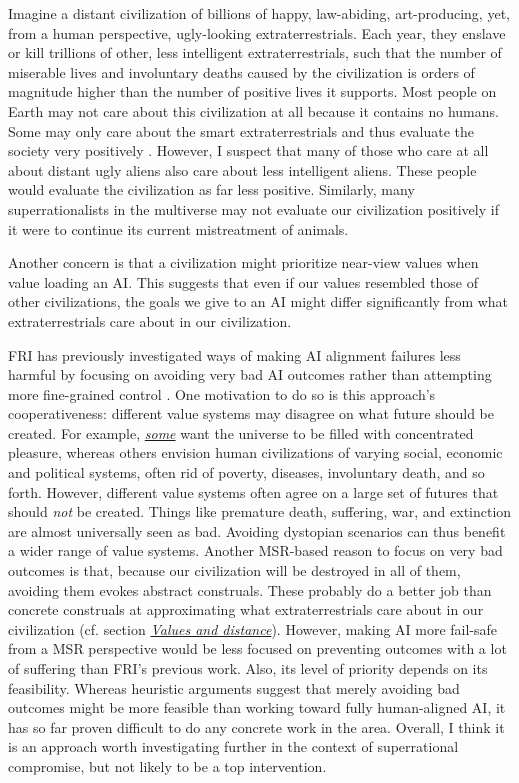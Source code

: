 Imagine a distant civilization of billions of happy, law-abiding,
art-producing, yet, from a human perspective, ugly-looking
extraterrestrials. Each year, they enslave or kill trillions of other,
less intelligent extraterrestrials, such that the number of miserable
lives and involuntary deaths caused by the civilization is orders of
magnitude higher than the number of positive lives it supports. Most
people on Earth may not care about this civilization at all because it
contains no humans. Some may only care about the smart extraterrestrials
and thus evaluate the society very positively
\parencite{Kagan2016-gc}. However, I suspect that many of
those who care at all about distant ugly aliens also care about less
intelligent aliens. These people would evaluate the civilization as far
less positive. Similarly, many superrationalists in the multiverse may
not evaluate our civilization positively if it were to continue its
current mistreatment of animals.

Another concern is that a civilization might prioritize near-view values
when value loading an AI. This suggests that even if our values
resembled those of other civilizations, the goals we give to an AI might
differ significantly from what extraterrestrials care about in our
civilization.

FRI has previously investigated ways of making AI alignment failures
less harmful by focusing on avoiding very bad AI outcomes rather than
attempting more fine-grained control
\parencite{Gloor2016-oy}. One motivation to do so is this
approach's cooperativeness: different value systems may disagree on what
future should be created. For example,
\href{https://www.hedweb.com/hedab.htm}{\emph{some}} want the universe
to be filled with concentrated pleasure, whereas others envision human
civilizations of varying social, economic and political systems, often
rid of poverty, diseases, involuntary death, and so forth. However,
different value systems often agree on a large set of futures that
should \emph{not} be created. Things like premature death, suffering,
war, and extinction are almost universally seen as bad. Avoiding
dystopian scenarios can thus benefit a wider range of value systems.
Another MSR-based reason to focus on very bad outcomes is that, because
our civilization will be destroyed in all of them, avoiding them evokes
abstract construals. These probably do a better job than concrete
construals at approximating what extraterrestrials care about in our
civilization (cf. section
\protect\hyperlink{values-and-distance}{\emph{Values and
distance}}). However, making AI more fail-safe from a MSR perspective
would be less focused on preventing outcomes with a lot of suffering
than FRI's previous work. Also, its level of priority depends on its
feasibility. Whereas heuristic arguments suggest that merely avoiding
bad outcomes might be more feasible than working toward fully
human-aligned AI, it has so far proven difficult to do any concrete work
in the area. Overall, I think it is an approach worth investigating
further in the context of superrational compromise, but not likely to be
a top intervention.


